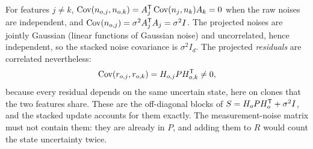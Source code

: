 \begin{solutions}
  \item For features $j \ne k$, $\operatorname{Cov}(n_{o,j}, n_{o,k}) = A_j^{\mathsf{T}}\operatorname{Cov}(n_j, n_k)A_k = 0$ when the raw noises are independent, and $\operatorname{Cov}(n_{o,j}) = \sigma^2A_j^{\mathsf{T}} A_j = \sigma^2I$. The projected
        noises are jointly Gaussian (linear functions of Gaussian noise) and uncorrelated, hence independent, so the stacked noise covariance is $\sigma^2I_d$. The
        projected \emph{residuals} are correlated nevertheless:
        \[
          \operatorname{Cov}(r_{o,j}, r_{o,k}) = H_{o,j}PH_{o,k}^{\mathsf{T}} \ne 0,
        \]
        because every residual depends on the same uncertain state, here on clones that the two features share. These are the off-diagonal blocks of $S = H_oPH_o^{\mathsf{T}} + \sigma^2I$,
        and the stacked update accounts for them exactly. The measurement-noise matrix must not contain them: they are already in $P$, and adding them to $R$
        would count the state uncertainty twice.
\end{solutions}
